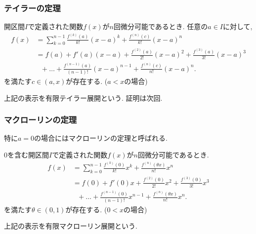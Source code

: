 \begin{frame}
\frametitle{テイラーの定理}


\begin{Thm}[テイラーの定理] \label{テイラー}
開区間$I$で定義された関数$f(x)$が$n$回微分可能であるとき. 
任意の$a \in I$に対して, 
 \begin{align*}
f(x) & = \sum_{k=0}^{n-1}\frac{f^{(k)}(a)}{k!}(x-a)^k + \frac{f^{(n)}(c)}{k!}(x-a)^n \\
& =  f(a)+ f'(a)(x-a) + \frac{f^{(2)}(a)}{2!}(x-a)^2  + \frac{f^{(3)}(a)}{3!}(x-a)^3 \\
& \ \ \ + \dots + \frac{f^{(n-1)}(a)}{(n-1)!}(x-a)^{n-1}+\frac{f^{(n)}(c)}{n!}(x-a)^n . 
\end{align*}
を満たす$c \in (a,x)$が存在する. ($a<x$の場合) 
\end{Thm}
上記の表示を有限テイラー展開という. 
証明は次回. 


\end{frame}








\begin{frame}
\frametitle{マクローリンの定理}


特に$a=0$の場合にはマクローリンの定理と呼ばれる. 


\begin{Thm}[マクローリンの定理]  \label{マクローリン}
$0$を含む開区間$I$で定義された関数$f(x)$が$n$回微分可能であるとき. 
 \begin{align*}
f(x) & = \sum_{k=0}^{n-1}\frac{f^{(k)}(0)}{k!}x^k + \frac{f^{(n)}(\theta x)}{n!}x^n \\
& =  f(0)+ f'(0)x + \frac{f^{(2)}(0)}{2!}x^2  + \frac{f^{(3)}(0)}{3!}x^3 \\
& \ \ \ + \dots + \frac{f^{(n-1)}(0)}{(n-1)!}x^{n-1}+\frac{f^{(n)}(\theta x)}{n!}x^n . 
\end{align*}
を満たす$\theta \in (0,1)$が存在する. ($0<x$の場合) 
\end{Thm}
上記の表示を有限マクローリン展開という.

\end{frame}





